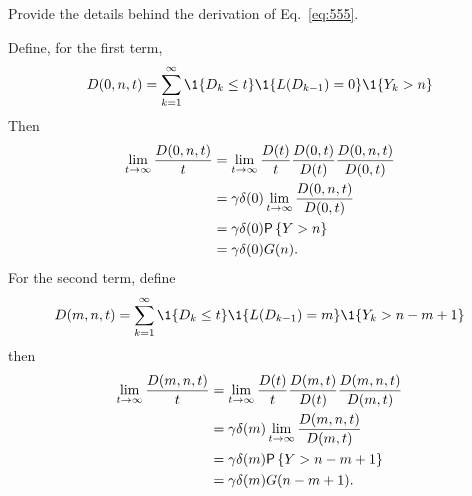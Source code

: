 \begin{question}
Provide the details behind the derivation of Eq.~\ref{eq:555}.
\begin{hint}
  
\end{hint}

\begin{solution}
 Define, for the first term,
\begin{equation*}
  D(0, n, t) = \sum_{k=1}^\infty \1{D_{k}\leq t}\1{L(D_{k-1})=0}\1{Y_k>n}
\end{equation*}
Then
\begin{equation*}
  \begin{split}
  \lim_{t\to\infty} \frac{  D(0, n, t)}t 
&=   \lim_{t\to\infty}  \frac{D(t)}t \frac{D(0, t)}{D(t)}\frac{ D(0, n, t)}{D(0,t)} \\
&=   \gamma \delta(0) \lim_{t\to\infty} \frac{ D(0, n, t)}{D(0,t)} \\
&=   \gamma \delta(0) \P{Y>n}\\
& = \gamma \delta(0) G(n).
  \end{split}
\end{equation*}
For the second term, define
\begin{equation*}
  D(m, n, t) = \sum_{k=1}^\infty \1{D_{k}\leq t}\1{L(D_{k-1})=m}\1{Y_k>n-m+1}
\end{equation*}
then
\begin{equation*}
  \begin{split}
  \lim_{t\to\infty} \frac{  D(m, n, t)}t 
&=   \lim_{t\to\infty}  \frac{D(t)}t \frac{D(m, t)}{D(t)}\frac{ D(m, n, t)}{D(m,t)} \\
&=   \gamma \delta(m) \lim_{t\to\infty} \frac{ D(m, n, t)}{D(m,t)} \\
&=   \gamma \delta(m) \P{Y>n-m+1}\\
& = \gamma \delta(m) G(n-m+1).
  \end{split}
\end{equation*}


\end{solution}
\end{question}



